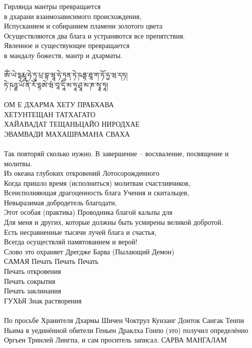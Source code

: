 \newpage
Гирлянда мантры превращается \\ \indent в дхарани взаимозависимого происхождения,\\
Испусканием и собиранием пламени золотого цвета\\
Осуществляются два блага и устраняются все препятствия.\\
Явленное и существующее превращается \\ \indent в мандалу божеств, мантр и дхарматы.\\
\\
\ti
ཨོཾ་ཡེ་དྷརྨཱ་ཧེ་ཏུ་པྲ་བྷ་ཝཱ་ཧེ་ཏུན་ཏེ་ཥནྟ་ཐཱ་ག་ཏོ་ཧྱ་ཝ་དཏ།\\
ཏེ་ཥཉྩ་ཡོ་ནི་རོ་དྷཨེ་ཝཾ་བཱ་དཱི་མ་ཧཱ་ཤྲཱ་མ་ཎ་སྭཱ་ཧཱ།\\
\\
\ru ОМ Е ДХАРМА ХЕТУ ПРАБХАВА \\
ХЕТУНТЕЩАН ТАТХАГАТО \\
ХАЙАВАДАТ ТЕЩАНЬЦАЙО НИРОДХАЕ\\
ЭВАМВАДИ МАХАШРАМАНА СВАХА\\
\\
\scriptsize
Так повторяй сколько нужно. В завершение – восхваление, посвящение и молитвы.\\
Из океана глубоких откровений Лотосорожденного\\
Когда пришло время (исполниться) молитвам счастливчиков,\\
Всеисполняющая драгоценность блага Учения и скитальцев,\\
Невыразимая добродетель благодати,\\
Этот особая (практика) Проводника благой кальпы для\\
Для меня и других, которые должны быть усмирены великой добротой.\\
Есть несравненные тысячи лучей блага и счастья,\\
Всегда осуществляй памятованием и верой!\\
Слово это охраняет Дрегдже Барва (Пылающий Демон)\\
САМАЯ Печать Печать Печать \\
Печать откровения \\
Печать сокрытия \\
Печать заклинания \\
ГУХЬЯ Знак растворения\\
\\
По просьбе Хранителя Дхармы Шичен Чоктрул Кунзанг Донток Сангак Тенпи Ньима
в уединённой обители Геньен Драклха Гонпо (это) получил определённо
Оргьен Тринлей Лингпа, и сам проситель записал. САРВА МАНГАЛАМ\\
\normalsize
\newpage
